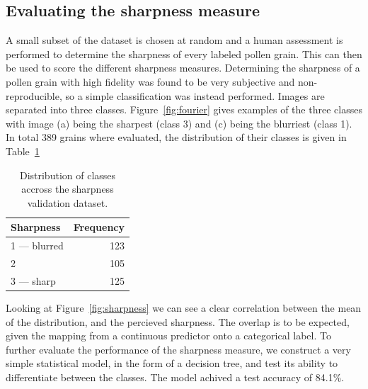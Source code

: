 \subsection{Evaluating the sharpness measure}

A small subset of the dataset is chosen at random and a human assessment is performed to determine the sharpness of every labeled pollen grain.
This can then be used to score the different sharpness measures.
Determining the sharpness of a pollen grain with high fidelity was found to be very subjective and non-reproducible, so a simple classification was instead performed.
Images are separated into three classes.
Figure~\ref{fig:fourier} gives examples of the three classes with image (a) being the sharpest (class 3) and (c) being the blurriest (class 1).
In total 389 grains where evaluated, the distribution of their classes is given in Table~\ref{tab:sharpness}

\begin{table}[htb]
  \caption[Sharpness dataset distribution]{Distribution of classes accross the sharpness validation dataset.}\label{tab:sharpness}
  \centering 
  \begin{tabular}{lr} \toprule
    Sharpness & Frequency \\ \midrule
    1 --- blurred & 123 \\
    2 & 105 \\
    3 --- sharp & 125 \\ \bottomrule
  \end{tabular}
\end{table}

Looking at Figure~\ref{fig:sharpness} we can see a clear correlation between the mean of the distribution, and the percieved sharpness.
The overlap is to be expected, given the mapping from a continuous predictor onto a categorical label.
To further evaluate the performance of the sharpness measure, we construct a very simple statistical model, in the form of a decision tree, and test its ability to differentiate between the classes.
The model achived a test accuracy of 84.1\%.

